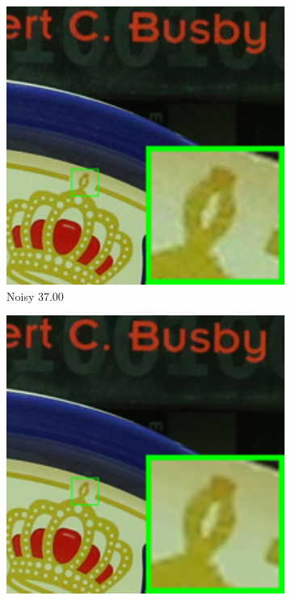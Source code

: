 \begin{figure}
    \centering
    \begin{subfigure}[t]{0.19\textwidth}
        \centering
        \includegraphics[width=1\textwidth]{images/guided/resize_br_Noisy_5dmark3_iso3200_1_real.png}
		\caption{Noisy 37.00}
    \end{subfigure}
    \hfill
    \begin{subfigure}[t]{0.19\textwidth}
        \centering
        \includegraphics[width=1\textwidth]{images/guided/resize_br_CBM3D_5dmark3_iso3200_1_real.png}

\end{subfigure}
\end{figure}
